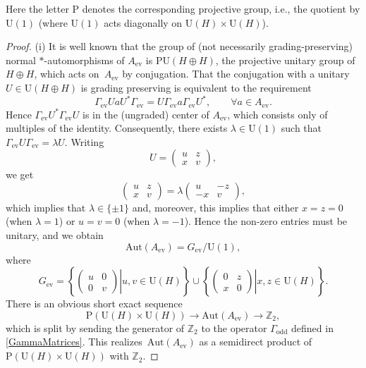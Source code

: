 \documentclass[11pt]{article}
\numberwithin{equation}{section}
\numberwithin{equation}{section}
\newcommand{\Z}{\mathbb{Z}}
\newcommand{\Aut}{\mathrm{Aut}}
\newcommand{\U}{\mathrm{U}}
\begin{document}
Here the letter $\mathrm{P}$ denotes the corresponding projective group, i.e., the quotient by $\U(1)$ (where $\U(1)$ acts diagonally on $\U(H) \times \U(H)$).

\begin{proof}
(i) It is well known that the group of (not necessarily grading-preserving) normal $*$-automorphisms of $A_{\mathrm{ev}}$ is $\mathrm{PU}(H \oplus H)$, the projective unitary group of $H \oplus H$, which acts on~$A_{\mathrm{ev}}$ by conjugation.
That the conjugation with a unitary $U \in \U(H\oplus H)$ is grading preserving is equivalent to the requirement
\begin{equation*}
 \Gamma_{\mathrm{ev}} U a U^* \Gamma_{\mathrm{ev}} = U \Gamma_{\mathrm{ev}} a \Gamma_{\mathrm{ev}} U^*, \qquad \forall a \in A_{\mathrm{ev}}.
\end{equation*}
Hence $\Gamma_{\mathrm{ev}}U^*\Gamma_{\mathrm{ev}} U$ is in the (ungraded) center of $A_{\mathrm{ev}}$, which consists only of multiples of the identity.
Consequently, there exists $\lambda \in \U(1)$ such that $\Gamma_{\mathrm{ev}} U\Gamma_{\mathrm{ev}} = \lambda U$.
Writing
\begin{equation*}
 U = \begin{pmatrix} u & z \\ x & v \end{pmatrix},
 \end{equation*}
 we get
 \begin{equation*}
 \begin{pmatrix} u & z \\ x & v \end{pmatrix} = \lambda\begin{pmatrix} u & -z \\ -x & v \end{pmatrix},
\end{equation*}
which implies that $\lambda \in \{\pm 1\}$ and, moreover, this implies that either $x = z = 0$ (when $\lambda = 1$) or $u = v = 0$ (when $\lambda = -1$).
Hence the non-zero entries must be unitary, and we obtain
\begin{equation*}	%
\Aut(A_{\mathrm{ev}}) = G_{\mathrm{ev}}/\U(1),
\end{equation*}
where
\begin{equation} \label{DefGev}
 G_{\mathrm{ev}} = \left\{ \left.\begin{pmatrix} u & 0 \\ 0 & v \end{pmatrix} \right| u, v \in \U(H)\right\} \cup \left\{ \left.\begin{pmatrix} 0 & z \\ x & 0 \end{pmatrix} \right| x, z \in \U(H)\right\}.
\end{equation}
There is an obvious short exact sequence
\begin{equation*}
\mathrm{P}(\U(H) \times \U(H)) \to \Aut(A_{\mathrm{ev}}) \to \Z_2,
\end{equation*}
which is split by sending the generator of $\Z_2$ to the operator $\Gamma_{\mathrm{odd}}$ defined in \eqref{GammaMatrices}.
This realizes~$\Aut(A_{\mathrm{ev}})$ as a semidirect product of $\mathrm{P}(\U(H) \times \U(H))$ with $\Z_2$.


\end{proof}
\end{document}
